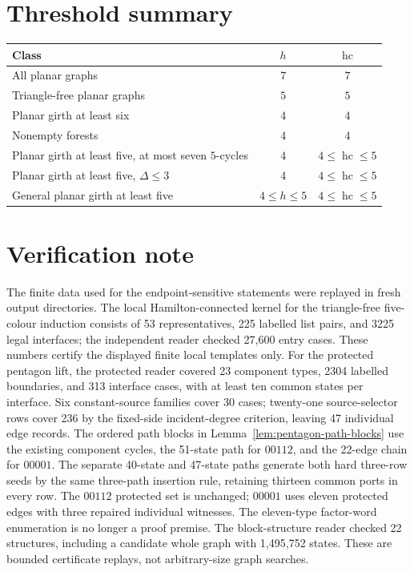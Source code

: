 \documentclass[11pt]{article}
\theoremstyle{remark}
\newcommand{\hc}{\operatorname{hc}}
\numberwithin{equation}{section}
\numberwithin{table}{section}
\begin{document}
\section{Threshold summary}
\begin{center}
\small
\begin{tabular}{lcc}
\toprule
Class & $h$ & $\hc$\\
\midrule
All planar graphs & $7$ & $7$\\
Triangle-free planar graphs & $5$ & $5$\\
Planar girth at least six & $4$ & $4$\\
Nonempty forests & $4$ & $4$\\
Planar girth at least five, at most seven $5$-cycles & $4$ & $4\le\hc\le5$\\
Planar girth at least five, $\Delta\le3$ & $4$ & $4\le\hc\le5$\\
General planar girth at least five & $4\le h\le5$ & $4\le\hc\le5$\\
\bottomrule
\end{tabular}
\end{center}

\section{Verification note}
\label{sec:verification}

The finite data used for the endpoint-sensitive statements were replayed in fresh output directories.  The local Hamilton-connected kernel for the triangle-free five-colour induction consists of 53 representatives, 225 labelled list pairs, and 3225 legal interfaces; the independent reader checked 27,600 entry cases.  These numbers certify the displayed finite local templates only.  For the protected pentagon lift, the protected reader covered 23 component types, 2304 labelled boundaries, and 313 interface cases, with at least ten common states per interface. Six constant-source families cover 30 cases; twenty-one source-selector rows cover 236 by the fixed-side incident-degree criterion, leaving 47 individual edge records. The ordered path blocks in Lemma~\ref{lem:pentagon-path-blocks} use the existing component cycles, the 51-state path for $00112$, and the 22-edge chain for $00001$. The separate 40-state and 47-state paths generate both hard three-row seeds by the same three-path insertion rule, retaining thirteen common ports in every row. The $00112$ protected set is unchanged; $00001$ uses eleven protected edges with three repaired individual witnesses. The eleven-type factor-word enumeration is no longer a proof premise.  The block-structure reader checked 22 structures, including a candidate whole graph with 1,495,752 states.  These are bounded certificate replays, not arbitrary-size graph searches.
\end{document}
